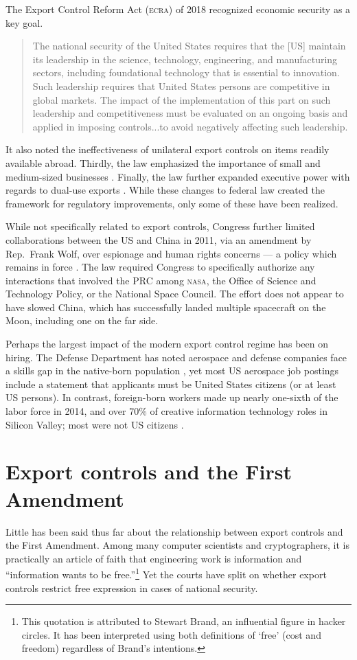 \documentclass[12pt]{olfmemo}
\begin{document}
The Export Control Reform Act (\textsc{ecra}) of 2018 recognized economic security as a key goal.
\begin{quote}
The national security of the United States requires that the [US] maintain its leadership in the science, technology, engineering, and manufacturing sectors, including foundational technology that is essential to innovation. Such leadership requires that United States persons are competitive in global markets. The impact of the implementation of this part on such leadership and competitiveness must be evaluated on an ongoing basis and applied in imposing controls...to avoid negatively affecting such leadership.
\end{quote} \citep[Section 1752(3)]{ECRA2018}
It also noted the ineffectiveness of unilateral export controls on items readily available abroad. Thirdly, the law emphasized the importance of small and medium-sized businesses \citep{ECRA2018}. Finally, the law further expanded executive power with regards to dual-use exports \citep{Fergusson2020}. While these changes to federal law created the framework for regulatory improvements, only some of these have been realized.

While not specifically related to export controls, Congress further limited collaborations between the US and China in 2011, via an amendment by Rep.~Frank Wolf, over espionage \citep{Pentland2011} and human rights concerns --- a policy which remains in force \citep{Foust2019}. The law required Congress to specifically authorize any interactions that involved the PRC among \textsc{nasa}, the Office of Science and Technology Policy, or the National Space Council. The effort does not appear to have slowed China, which has successfully landed multiple spacecraft on the Moon, including one on the far side.

Perhaps the largest impact of the modern export control regime has been on hiring. The Defense Department has noted aerospace and defense companies face a skills gap in the native-born population \citep{DoD2018}, yet most US aerospace job postings include a statement that applicants must be United States citizens (or at least US persons). In contrast, foreign-born workers made up nearly one-sixth of the labor force in 2014, and over 70\% of creative information technology roles in Silicon Valley; most were not US citizens \citep{Otoiu2017}.

\section{Export controls and the First Amendment}
Little has been said thus far about the relationship between export controls and the First Amendment. Among many computer scientists and cryptographers, it is practically an article of faith that engineering work is information and ``information wants to be free.''\footnote{This quotation is attributed to Stewart Brand, an influential figure in hacker circles. It has been interpreted using both definitions of `free' (cost and freedom) regardless of Brand's intentions.} Yet the courts have split on whether export controls restrict free expression in cases of national security.
\end{document}
